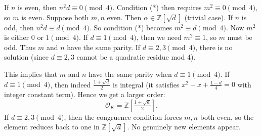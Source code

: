 \documentclass[12pt]{article}  %
\begin{document}
\begin{solution}
If $n$ is even, then $n^2 d \equiv 0 \pmod 4$. Condition (*) then requires $m^2 \equiv 0 \pmod 4$, so $m$ is even. Suppose both $m,n$ even. Then $\alpha \in \mathbb Z[\sqrt d]$ (trivial case). If $n$ is odd, then $n^2 d \equiv d \pmod 4$. So condition (*) becomes $m^2 \equiv d \pmod 4$. Now $m^2$ is either $0$ or $1 \pmod 4$. If $d\equiv 1\pmod 4$, then we need $m^2\equiv 1$, so $m$ must be odd. Thus $m$ and $n$ have the same parity. If $d\equiv 2,3\pmod 4$, there is no solution (since $d\equiv 2,3$ cannot be a quadratic residue mod 4).


This implies that $m$ and $n$ have the same parity when $d\equiv 1\pmod 4$. If $d\equiv 1\pmod 4$, then indeed $\frac{1+\sqrt d}{2}$ is integral (it satisfies $x^2-x+\frac{1-d}{4}=0$ with integer constant term). Hence we get a larger order:
\[
\mathcal O_K = \mathbb Z\left[\tfrac{1+\sqrt d}{2}\right].
\]
If $d\equiv 2,3\pmod 4$, then the congruence condition forces $m,n$ both even, so the element reduces back to one in $\mathbb Z[\sqrt d]$. No genuinely new elements appear.

\end{solution}
\end{document}
